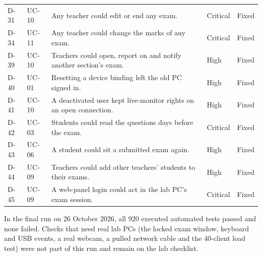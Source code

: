 {\begin{longtable}{@{}P{1.5cm}P{1.8cm}P{8.3cm}P{1.7cm}>{\centering\arraybackslash}p{1.3cm}@{}}
D-31 & UC-10 & Any teacher could edit or end any exam. & Critical & Fixed\\
D-34 & UC-11 & Any teacher could change the marks of any exam. & Critical & Fixed\\
D-39 & UC-10 & Teachers could open, report on and notify another section's exam. & High & Fixed\\
D-40 & UC-01 & Resetting a device binding left the old PC signed in. & High & Fixed\\
D-41 & UC-10 & A deactivated user kept live-monitor rights on an open connection. & High & Fixed\\
D-42 & UC-03 & Students could read the questions days before the exam. & Critical & Fixed\\
D-43 & UC-06 & A student could sit a submitted exam again. & High & Fixed\\
D-44 & UC-09 & Teachers could add other teachers' students to their exams. & High & Fixed\\
D-45 & UC-09 & A web-panel login could act in the lab PC's exam session. & Critical & Fixed\\
\end{longtable}}

In the final run on 26 October 2026, all 920 executed automated tests passed and none failed. Checks that need real lab PCs (the locked exam window, keyboard and USB events, a real webcam, a pulled network cable and the 40-client load test) were not part of this run and remain on the lab checklist.
